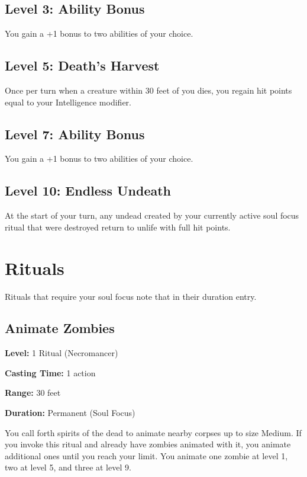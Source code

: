 \documentclass[12pt,letterpaper,twocolumn,openany,nodeprecatedcode,bg=none]{dndbook}
\let\oldsubsection\subsection
\renewcommand{\subsection}[1]{%
  \needspace{5\baselineskip}%
  \oldsubsection{#1}%
}
\begin{document}
\subsection{Level 3: Ability Bonus}\label{level-3-ability-bonus}

You gain a +1 bonus to two abilities of your choice.

\subsection{Level 5: Death's Harvest}\label{level-5-deaths-harvest}

Once per turn when a creature within 30 feet of you dies, you regain hit
points equal to your Intelligence modifier.

\subsection{Level 7: Ability Bonus}\label{level-7-ability-bonus}

You gain a +1 bonus to two abilities of your choice.

\subsection{Level 10: Endless Undeath}\label{level-10-endless-undeath}

At the start of your turn, any undead created by your currently active
soul focus ritual that were destroyed return to unlife with full hit
points.

\newpage

\section{Rituals}\label{rituals}

Rituals that require your soul focus note that in their duration entry.

\subsection{Animate Zombies}\label{animate-zombies}

\textbf{Level:} 1 Ritual (Necromancer)

\textbf{Casting Time:} 1 action

\textbf{Range:} 30 feet

\textbf{Duration:} Permanent (Soul Focus)

You call forth spirits of the dead to animate nearby corpses up to size
Medium. If you invoke this ritual and already have zombies animated with
it, you animate additional ones until you reach your limit. You animate
one zombie at level 1, two at level 5, and three at level 9.
\end{document}
